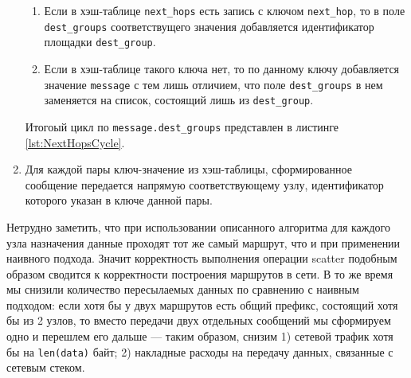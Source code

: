 \documentclass{article}
\theoremstyle{plain}
\theoremstyle{plain}
\theoremstyle{plain}
\theoremstyle{plain}
\theoremstyle{definition}
\theoremstyle{remark}
\theoremstyle{plain}
\begin{document}
\begin{enumerate}
\begin{enumerate}
        \item Если в хэш-таблице \texttt{next\_hops} есть запись с ключом \texttt{next\_hop}, то в поле \texttt{dest\_groups} соответствущего значения добавляется идентификатор площадки \texttt{dest\_group}.
        
        \item Если в хэш-таблице такого ключа нет, то по данному ключу добавляется значение \texttt{message} с тем лишь отличием, что поле \texttt{dest\_groups} в нем заменяется на список, состоящий лишь из \texttt{dest\_group}.
    \end{enumerate}
    
    Итогоый цикл по \texttt{message.dest\_groups} представлен в листинге \ref{lst:NextHopsCycle}.
    
        
    \item Для каждой пары ключ-значение из хэш-таблицы, сформированное сообщение передается напрямую соответствующему узлу, идентификатор которого указан в ключе данной пары.
\end{enumerate}

Нетрудно заметить, что при использовании описанного алгоритма для каждого узла назначения данные проходят тот же самый маршрут, что и при применении наивного подхода. Значит корректность выполнения операции scatter подобным образом сводится к корректности построения маршрутов в сети. В то же время мы снизили количество пересылаемых данных по сравнению с наивным подходом: если хотя бы у двух маршрутов есть общий префикс, состоящий хотя бы из 2 узлов, то вместо передачи двух отдельных сообщений мы сформируем одно и перешлем его дальше --- таким образом, снизим 1) сетевой трафик хотя бы на \texttt{len(data)} байт; 2) накладные расходы на передачу данных, связанные с сетевым стеком.
\end{document}
